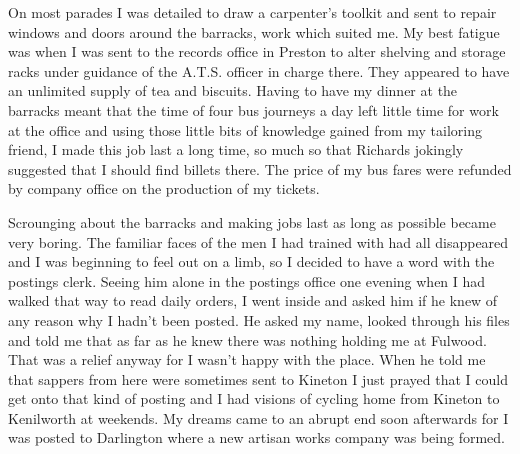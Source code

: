 On most parades I was detailed to draw a carpenter's toolkit and sent
to repair windows and doors around the barracks, work which suited me.
My best fatigue was when I was sent to the records office in Preston
to alter shelving and storage racks under guidance of the
A.T.S. officer in charge there. They appeared to have an unlimited
supply of tea and biscuits. Having to have my dinner at the barracks
meant that the time of four bus journeys a day left little time for
work at the office and using those little bits of knowledge gained
from my tailoring friend, I made this job last a long time, so much so
that \sergeantM Richards jokingly suggested that I should find billets
there. The price of my bus fares were refunded by company office on
the production of my tickets.

Scrounging about the barracks and making jobs last as long as possible
became very boring. The familiar faces of the men I had trained with
had all disappeared and I was beginning to feel out on a limb, so I
decided to have a word with the postings clerk. Seeing him alone in
the postings office one evening when I had walked that way to read
daily orders, I went inside and asked him if he knew of any reason why
I hadn't been posted. He asked my name, looked through his files and
told me that as far as he knew there was nothing holding me at
Fulwood. That was a relief anyway for I wasn't happy with the place.
When he told me that sappers from here were sometimes sent to Kineton
I just prayed that I could get onto that kind of posting and I had
visions of cycling home from Kineton to Kenilworth at weekends. My
dreams came to an abrupt end soon afterwards for I was posted to
Darlington where a new artisan works company was being formed.

